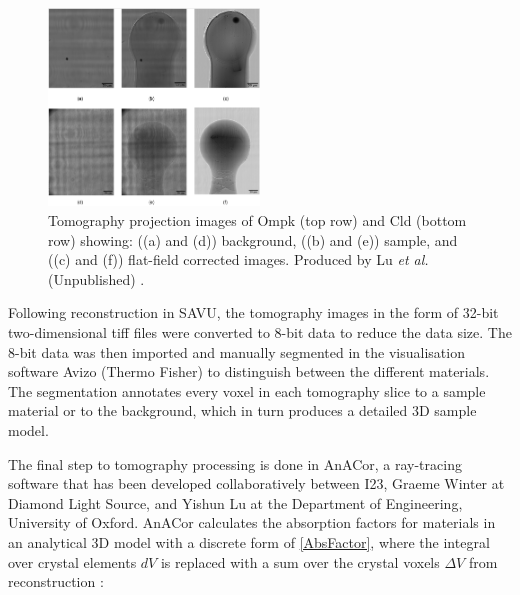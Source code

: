 \begin{figure}
    \centering
    \includegraphics[width = 0.5\textwidth]{images/Tomo projection images CLD and Ompk high quality.png}
    \caption{Tomography projection images of Ompk (top row) and Cld (bottom row) showing: ((a) and (d)) background,  ((b) and (e)) sample, and ((c) and (f)) flat-field corrected images. Produced by Lu \textit{et al.} (Unpublished) \cite{Lu}.}
    \label{fig:tomo projections}
\end{figure}

Following reconstruction in SAVU, the tomography images in the form of 32-bit two-dimensional tiff files were converted to 8-bit data to reduce the data size. The 8-bit data was then imported and manually segmented in the visualisation software Avizo (Thermo Fisher) to distinguish between the different materials. The segmentation annotates every voxel in each tomography slice to a sample material or to the background, which in turn produces a detailed 3D sample model.


The final step to tomography processing is done in AnACor, a ray-tracing software that has been developed collaboratively between I23, Graeme Winter at Diamond Light Source, and Yishun Lu at the Department of Engineering, University of Oxford. AnACor calculates the absorption factors for materials in an analytical 3D model with a discrete form of \cref{AbsFactor}, where the integral over crystal elements $dV$ is replaced with a sum over the crystal voxels $\Delta V$ from  reconstruction \cite{Lu}: %

